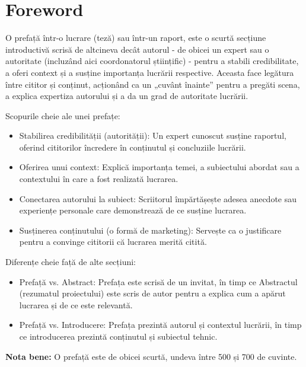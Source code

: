 \chapter*{Foreword}
O prefață într-o lucrare (teză) sau într-un raport, este o scurtă secțiune introductivă scrisă de altcineva decât autorul - de obicei un expert sau o autoritate (incluzând aici coordonatorul științific) - pentru a stabili credibilitate, a oferi context și a susține importanța lucrării respective. Aceasta face legătura între cititor și conținut, acționând ca un „cuvânt înainte” pentru a pregăti scena, a explica expertiza autorului și a da un grad de  autoritate lucrării.

Scopurile cheie ale unei prefațe:
\begin{itemize}
	\item Stabilirea credibilității (autorității): Un expert cunoscut susține raportul, oferind cititorilor încredere în conținutul și concluziile lucrării.
	\item Oferirea unui context: Explică importanța temei, a subiectului abordat sau a contextului în care a fost realizată lucrarea.
	\item Conectarea autorului la subiect: Scriitorul împărtășește adesea anecdote sau experiențe personale care demonstrează de ce susține lucrarea.
	\item Susținerea conținutului (o formă de marketing): Servește ca o justificare pentru a convinge cititorii că lucrarea merită citită.
\end{itemize}

Diferențe cheie față de alte secțiuni:
\begin{itemize}
	\item Prefață vs. Abstract: Prefața este scrisă de un invitat, în timp ce Abstractul (rezumatul proiectului) este scris de autor pentru a explica cum a apărut lucrarea și de ce este relevantă.
	\item Prefață vs. Introducere: Prefața prezintă autorul și contextul lucrării, în timp ce introducerea prezintă conținutul și subiectul tehnic.
\end{itemize}


\begin{flushleft}
	\textbf{Nota bene:} O prefață este de obicei scurtă, undeva între 500 și 700 de cuvinte.
\end{flushleft}

